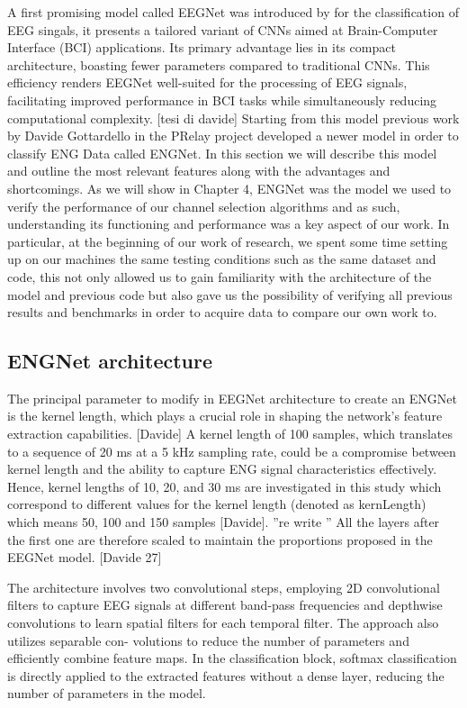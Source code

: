 \documentclass{Configuration_Files/PoliMi3i_thesis}
\begin{document}
A first promising model called EEGNet was introduced by \cite{lawhernEEGNetCompactConvolutional2018} for the classification of EEG singals, it presents a tailored variant of CNNs aimed at Brain-Computer Interface (BCI) applications. Its primary advantage lies in its compact architecture, boasting fewer parameters compared to traditional CNNs. This efficiency renders EEGNet well-suited for the processing of EEG signals, facilitating improved performance in BCI tasks while simultaneously reducing computational complexity. [tesi di davide]
Starting from this model previous work by Davide Gottardello in the PRelay project developed a newer model in order to classify ENG Data called ENGNet.
In this section we will describe this model and outline the most relevant features along with the advantages and shortcomings.
As we will show in Chapter 4, ENGNet was the model we used to verify the performance of our channel selection algorithms and as such, understanding its functioning and performance was a key aspect of our work.
In particular, at the beginning of our work of research, we spent some time setting up on our machines the same testing conditions such as the same dataset and code, this not only allowed us to gain familiarity with the architecture of the model and previous code but also gave us the possibility of verifying all previous results and benchmarks in order to acquire data to compare our own work to. 

\subsection{ENGNet architecture}

The principal parameter to modify in EEGNet architecture to create an ENGNet is the kernel length, which plays a crucial role in shaping the network’s feature extraction capabilities. [Davide]
A kernel length of 100 samples, which translates to a sequence of 20 ms at a 5 kHz sampling rate, could be a compromise between kernel length and the ability to capture ENG signal characteristics effectively. Hence, kernel lengths of 10, 20, and 30 ms are investigated in this study which correspond to different values for the kernel length (denoted as kernLength) which means 50, 100 and 150 samples [Davide].
''re write ''
All the layers after the first one are therefore scaled to maintain the proportions proposed in the EEGNet model. [Davide 27]



The architecture involves two convolutional steps, employing 2D convolutional filters to capture EEG signals at different band-pass frequencies and depthwise convolutions to learn spatial filters for each temporal filter. The approach also utilizes separable con- volutions to reduce the number of parameters and efficiently combine feature maps. In the classification block, softmax classification is directly applied to the extracted features without a dense layer, reducing the number of parameters in the model.
\end{document}
